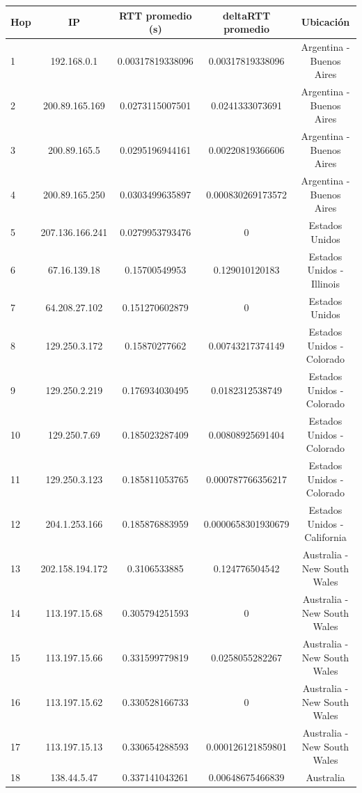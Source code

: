 \begin{tabular}{ | l | c | c | c | c |}
 
  \hline                 
  Hop & IP &  RTT promedio (s)  & deltaRTT promedio & Ubicación\\
  \hline
  1  &  192.168.0.1  &  0.00317819338096  &  0.00317819338096 & Argentina - Buenos Aires\\
  \hline
  2  &  200.89.165.169  &  0.0273115007501  &  0.0241333073691 & Argentina - Buenos Aires\\
  \hline
  3  &  200.89.165.5  &  0.0295196944161  &  0.00220819366606 & Argentina - Buenos Aires\\
  \hline
  4  &  200.89.165.250  &  0.0303499635897  &  0.000830269173572 & Argentina - Buenos Aires\\
  \hline
  5  &  207.136.166.241  &  0.0279953793476  &  0 & Estados Unidos\\
  \hline
  6  &  67.16.139.18  &  0.15700549953  &  0.129010120183 & Estados Unidos - Illinois\\
  \hline
  7  &  64.208.27.102  &  0.151270602879  &  0 & Estados Unidos\\
  \hline
  8  &  129.250.3.172  &  0.15870277662  &  0.00743217374149 & Estados Unidos - Colorado\\
  \hline
  9  &  129.250.2.219  &  0.176934030495  &  0.0182312538749 & Estados Unidos - Colorado\\
  \hline
  10  &  129.250.7.69  &  0.185023287409  &  0.00808925691404 & Estados Unidos - Colorado\\
  \hline
  11  &  129.250.3.123  &  0.185811053765  &  0.000787766356217 & Estados Unidos - Colorado\\
  \hline
  12  &  204.1.253.166  &  0.185876883959  &  0.0000658301930679 & Estados Unidos - California\\
  \hline
  13  &  202.158.194.172  &  0.3106533885  &  0.124776504542 & Australia - New South Wales\\
  \hline
  14  &  113.197.15.68  &  0.305794251593  &  0 & Australia - New South Wales\\
  \hline
  15  &  113.197.15.66  &  0.331599779819  &  0.0258055282267 & Australia - New South Wales\\
  \hline
  16  &  113.197.15.62  &  0.330528166733  &  0 & Australia - New South Wales\\
  \hline
  17  &  113.197.15.13  &  0.330654288593  &  0.000126121859801 & Australia - New South Wales\\
  \hline
  18  &  138.44.5.47  &  0.337141043261  &  0.00648675466839 & Australia\\

\end{tabular}
